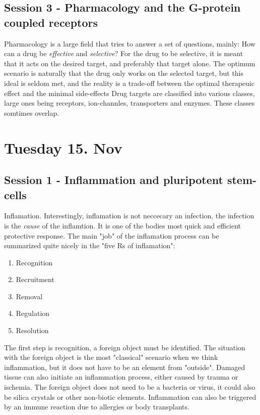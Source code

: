 \documentclass[12p]{article}
\begin{document}
\subsection*{Session 3 - Pharmacology and the G-protein coupled receptors}

Pharmacology is a large field that tries to answer a set of questions, mainly: How can a drug be \emph{effective} and \emph{selective}?
For the drug to be selective, it is meant that it acts on the desired target, and preferably that target alone.
The optimum scenario is naturally that the drug only works on the selected target, but this ideal is seldom met, and the reality is a trade-off between the optimal therapeuic effect and the minimal side-effects
Drug targets are classified into various classes, large ones being receptors, ion-channles, transporters and enzymes. 
These classes somtimes overlap.


\section*{Tuesday 15. Nov}

\subsection*{Session 1 - Inflammation and pluripotent stem-cells}

Inflamation. 
Interestingly, inflamation is not neccecary an infection, the infection is the \emph{cause} of the inflamtion.
It is one of the bodies most quick and efficient protective response.
The main "job" of the inflamation process can be summarized quite nicely in the "five Rs of inflamation":

\begin{enumerate}
    \item
	Recognition 
    \item
	Recruitment 
    \item
	Removal
    \item
	Regulation
    \item
	Resolution
\end{enumerate}

The first step is recognition, a foreign object must be identified.
The situation with the foreign object is the most "classical" scenario when we think inflammation, but it does not have to be an element from "outside".
Damaged tissue can also initiate an inflammation process, either caused by trauma or ischemia.
The foreign object does not need to be a bacteria or virus, it could also be silica crystals or other non-biotic elements.
Inflammation can also be triggered by an immune reaction due to allergies or body transplants.
\end{document}
